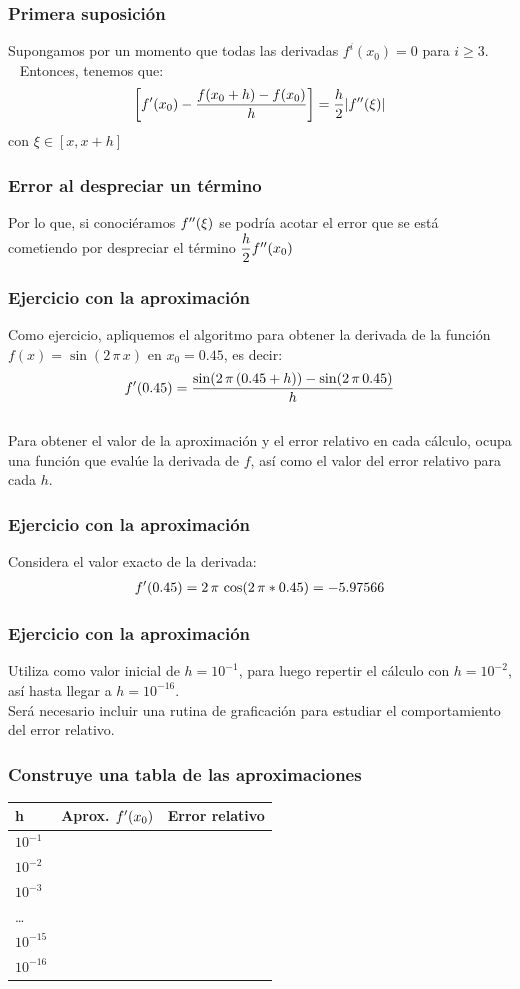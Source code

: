 \documentclass[12pt]{beamer}
\begin{document}
\begin{frame}
\frametitle{Primera suposición}
Supongamos por un momento que todas las derivadas $f^{i}(x_{0}) = 0$ para $i \geq 3$.
\\\
\bigskip
\pause
Entonces, tenemos que:
\begin{align*}
\left[ {f}^{\prime} (x_{0}) - \dfrac{f (x_{0} + h) - f (x_{0})}{h} \right] = \dfrac{h}{2} \abs{ {f}^{\prime \prime} (\xi) }
\end{align*}
con $\xi \in [x, x + h]$
\end{frame}
\begin{frame}
\frametitle{Error al despreciar un término}
Por lo que, si conociéramos ${f}^{\prime \prime} (\xi)$ se podría acotar el error que se está cometiendo por despreciar el término $\dfrac{h}{2} {f}^{\prime \prime} (x_{0})$
\end{frame}
\begin{frame}
\frametitle{Ejercicio con la aproximación}
Como ejercicio, apliquemos el algoritmo para obtener la derivada de la función $f (x) = \sin(2 \, \pi \,  x)$ en $x_{0} = 0.45$, es decir:
\begin{align*}
{f}^{\prime} (0.45) = \dfrac{\sin (2 \, \pi \, (0.45 + h)) - \sin (2 \, \pi \, 0.45)}{h}
\end{align*}
\\
\bigskip
\pause
Para obtener el valor de la aproximación y el error relativo en cada cálculo, ocupa una función que evalúe la derivada de $f$, así como el valor del error relativo para cada $h$.
\end{frame}
\begin{frame}
\frametitle{Ejercicio con la aproximación}
Considera el valor exacto de la derivada:
\begin{align*}
{f}^{\prime} (0.45) = 2 \, \pi \, \cos(2 \, \pi * 0.45) = -5.97566
\end{align*}
\end{frame}
\begin{frame}
\frametitle{Ejercicio con la aproximación}
Utiliza como valor inicial de $h = 10^{-1}$, para luego repertir el cálculo con $h = 10^{-2}$, así hasta llegar a $h = 10^{-16}$.
\\
\bigskip
\pause
Será necesario incluir una rutina de graficación para estudiar el comportamiento del error relativo.
\end{frame}
\begin{frame}
\frametitle{Construye una tabla de las aproximaciones}
\begin{table}
\renewcommand{\arraystretch}{0.9}
\centering
\begin{tabular}{l | l | l}
h & Aprox. ${f}^{\prime} (x_{0})$ & Error relativo\\ \hline
$10^{-1}$ & & \\ \hline
$10^{-2}$ & & \\ \hline
$10^{-3}$ & & \\ \hline
\ldots & & \\ \hline
$10^{-15}$ & & \\ \hline
$10^{-16}$ & & \\ \hline
\end{tabular}
\end{table}
\end{frame}
\end{document}
